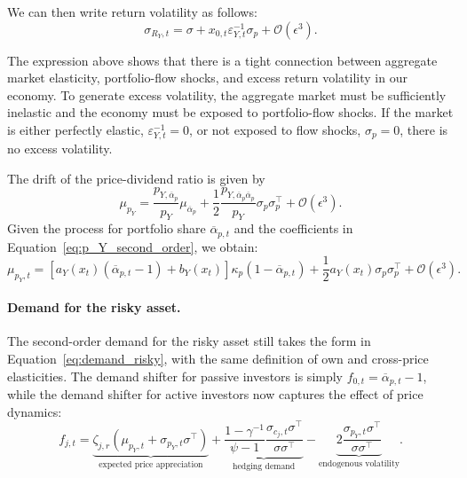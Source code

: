 \documentclass[12pt,english]{article}
\begin{document}
We can then write return volatility as follows:
\begin{equation}\label{eq:sigma_R_Y_second_order}
    \sigma_{R_Y,t} = \sigma + x_{0,t} \varepsilon_{Y,t}^{-1} \sigma_p + \mathcal{O}(\epsilon^3).
\end{equation}

The expression above shows that there is a tight connection between aggregate market elasticity, portfolio-flow shocks, and excess return volatility in our economy.
To generate excess volatility, the aggregate market must be sufficiently inelastic and the economy must be exposed to portfolio-flow shocks.
If the market is either perfectly elastic, $\varepsilon_{Y,t}^{-1} = 0$, or not exposed to flow shocks, $\sigma_p = 0$, there is no excess volatility.

The drift of the price-dividend ratio is given by
\begin{equation}
    \mu_{p_Y} = \frac{p_{Y,\overline{\alpha}_p}}{p_{Y}} \mu_{\overline{\alpha}_p} + \frac{1}{2} \frac{p_{Y,\overline{\alpha}_p\overline{\alpha}_p}}{p_{Y}} \sigma_p \sigma_p^\top + \mathcal{O}(\epsilon^3).
\end{equation}
Given the process for portfolio share $\overline{\alpha}_{p,t}$ and the coefficients in Equation~\eqref{eq:p_Y_second_order}, we obtain:
\begin{equation}
    \mu_{p_Y,t} = \left[a_Y(x_t) (\overline{\alpha}_{p,t}-1) + b_Y(x_t)\right] \kappa_p (1-\overline{\alpha}_{p,t})  + \frac{1}{2} a_Y(x_t) \sigma_p \sigma_p^\top + \mathcal{O}(\epsilon^3).
\end{equation}

\paragraph{Demand for the risky asset.} The second-order demand for the risky asset still takes the form in Equation~\eqref{eq:demand_risky}, with the same definition of own and cross-price elasticities.
The demand shifter for passive investors is simply $f_{0,t} = \overline{\alpha}_{p,t} - 1$, 
while the demand shifter for active investors now captures the effect of price dynamics:
\begin{equation}
    f_{j,t} = \underbrace{\zeta_{j,r} (\mu_{p_Y,t} +\sigma_{p_Y,t}\sigma^\top)}_{\text{expected price appreciation}} +\underbrace{ \frac{1-\gamma^{-1}}{\psi-1} \frac{\sigma_{c_j,t} \sigma^\top}{\sigma \sigma^\top}}_{\text{hedging demand}}- \underbrace{2 \frac{\sigma_{p_Y,t} \sigma ^\top}{\sigma \sigma^\top}}_{\text{endogenous volatility}}.
\end{equation}
\end{document}
